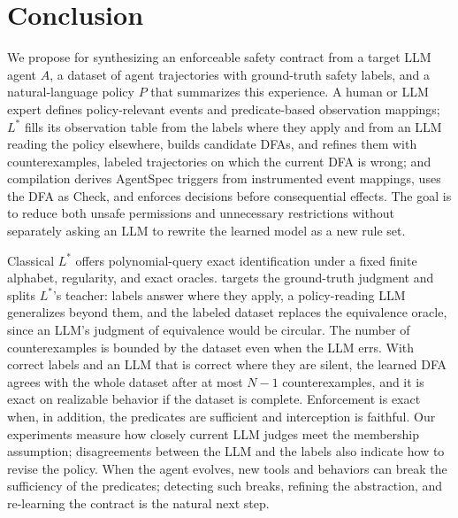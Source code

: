 \section{Conclusion}
We propose \system for synthesizing an enforceable safety contract from a target LLM agent $A$, a dataset of agent trajectories with ground-truth safety labels, and a natural-language policy $P$ that summarizes this experience. A human or LLM expert defines policy-relevant events and predicate-based observation mappings; $L^*$ fills its observation table from the labels where they apply and from an LLM reading the policy elsewhere, builds candidate DFAs, and refines them with counterexamples, labeled trajectories on which the current DFA is wrong; and compilation derives AgentSpec triggers from instrumented event mappings, uses the DFA as Check, and enforces decisions before consequential effects. The goal is to reduce both unsafe permissions and unnecessary restrictions without separately asking an LLM to rewrite the learned model as a new rule set.

Classical $L^*$ offers polynomial-query exact identification under a fixed finite alphabet, regularity, and exact oracles. \system targets the ground-truth judgment and splits $L^*$'s teacher: labels answer where they apply, a policy-reading LLM generalizes beyond them, and the labeled dataset replaces the equivalence oracle, since an LLM's judgment of equivalence would be circular. The number of counterexamples is bounded by the dataset even when the LLM errs. With correct labels and an LLM that is correct where they are silent, the learned DFA agrees with the whole dataset after at most $N-1$ counterexamples, and it is exact on realizable behavior if the dataset is complete. Enforcement is exact when, in addition, the predicates are sufficient and interception is faithful. Our experiments measure how closely current LLM judges meet the membership assumption; disagreements between the LLM and the labels also indicate how to revise the policy. When the agent evolves, new tools and behaviors can break the sufficiency of the predicates; detecting such breaks, refining the abstraction, and re-learning the contract is the natural next step.
